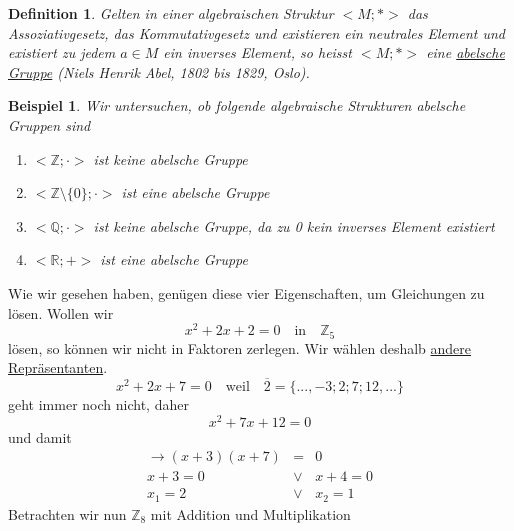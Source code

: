 \documentclass{report}
\newtheorem{mydef}{Definition}
\newtheorem{myexample}{Beispiel}
\begin{document}
\begin{mydef}Gelten in einer algebraischen Struktur $< M ; * >$ das Assoziativgesetz, das Kommutativgesetz und existieren ein neutrales Element und existiert zu jedem $a \in M$ ein inverses Element, so heisst $< M ; * >$ eine \underline{abelsche Gruppe} (Niels Henrik Abel, 1802 bis 1829, Oslo).\end{mydef}
\begin{myexample}Wir untersuchen, ob folgende algebraische Strukturen abelsche Gruppen sind
\begin{enumerate}
\item $< \mathbb{Z}; \cdot >$ ist keine abelsche Gruppe
\item $< \mathbb{Z} \setminus \{0\} ; \cdot >$ ist eine abelsche Gruppe
\item $<\mathbb{Q}; \cdot>$ ist keine abelsche Gruppe, da zu 0 kein inverses Element existiert
\item $< \mathbb{R}; + >$ ist eine abelsche Gruppe\end{enumerate}
\end{myexample}
Wie wir gesehen haben, genügen diese vier Eigenschaften, um Gleichungen zu lösen. Wollen wir
\begin{equation}x^2 + 2x + 2 = 0 \quad \mbox{in} \quad \mathbb{Z}_5\end{equation}
lösen, so können wir nicht in Faktoren zerlegen. Wir wählen deshalb \underline{andere Repräsentanten}.
\begin{equation}x^2 + 2x + 7 = 0 \quad \mbox{weil} \quad \overline{2} = \{..., -3; 2; 7; 12, ...\}\end{equation}
geht immer noch nicht, daher
\begin{equation}x^2 + 7x + 12 = 0\end{equation}
und damit
\begin{eqnarray}\to (x+3)(x+7) & = & 0\nonumber \\
x+3 = 0 & \lor & x+4 = 0\nonumber \\
x_1 = 2 & \lor & x_2 = 1\end{eqnarray}
Betrachten wir nun $\mathbb{Z}_8$ mit Addition und Multiplikation
\end{document}
